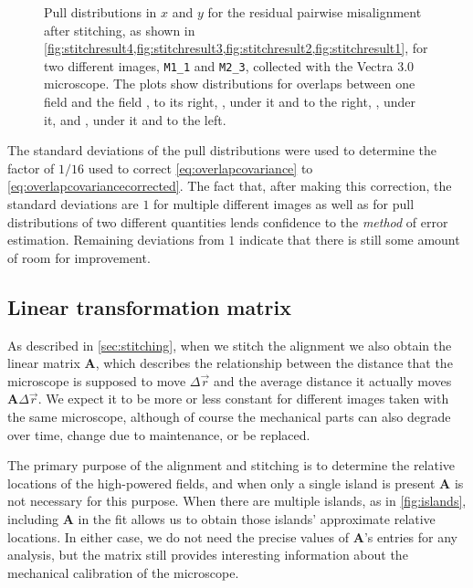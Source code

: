 \documentclass{article}
\newcommand{\matrixbold}[1]{\mathbf{#1}}
\newcommand{\M}[2]{\texttt{M#1\_#2}}
\begin{document}
\begin{figure}[ht]
\begin{subfigure}{0.24\linewidth}
		\caption{}
		\label{fig:stitchpull12}
	\end{subfigure}
	\caption{Pull distributions in $x$ and $y$ for the residual pairwise misalignment after stitching, as shown in \cref{fig:stitchresult4,fig:stitchresult3,fig:stitchresult2,fig:stitchresult1}, for two different images, \M11 and \M23, collected with the Vectra 3.0 microscope.  The plots show distributions for overlaps between one field and the field ,  to its right, ,  under it and to the right, ,   under it, and ,   under it and to the left.}
	\label{fig:stitchpulls}
\end{figure}

The standard deviations of the pull distributions were used to determine the factor of $1/16$ used to correct \cref{eq:overlapcovariance} to \cref{eq:overlapcovariancecorrected}.  The fact that, after making this correction, the standard deviations are $1$ for multiple different images as well as for pull distributions of two different quantities lends confidence to the \emph{method} of error estimation.  Remaining deviations from $1$ indicate that there is still some amount of room for improvement.

\clearpage

\subsection{Linear transformation matrix}

As described in \cref{sec:stitching}, when we stitch the alignment we also obtain the linear matrix $\matrixbold{A}$, which describes the relationship between the distance that the microscope is supposed to move $\Delta\vec{r}$ and the average distance it actually moves $\matrixbold{A}\Delta\vec{r}$.  We expect it to be more or less constant for different images taken with the same microscope, although of course the mechanical parts can also degrade over time, change due to maintenance, or be replaced.

The primary purpose of the alignment and stitching is to determine the relative locations of the high-powered fields, and when only a single island is present $\matrixbold{A}$ is not necessary for this purpose.  When there are multiple islands, as in \cref{fig:islands}, including $\matrixbold{A}$ in the fit allows us to obtain those islands' approximate relative locations.  In either case, we do not need the precise values of $\matrixbold{A}$'s entries for any analysis, but the matrix still provides interesting information about the mechanical calibration of the microscope.
\end{document}
